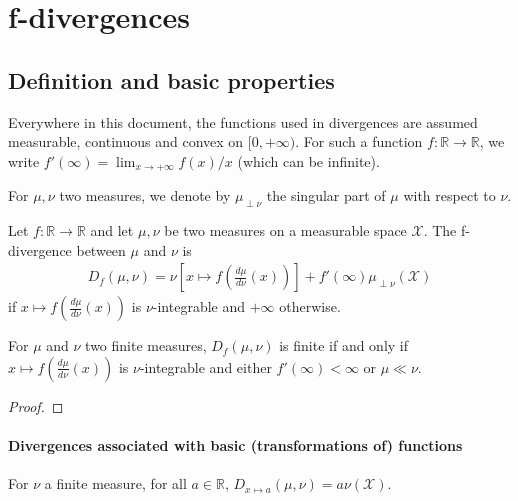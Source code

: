 \section{f-divergences}

\subsection{Definition and basic properties}

Everywhere in this document, the functions used in divergences are assumed measurable, continuous and convex on $[0, +\infty)$.
For such a function $f : \mathbb{R} \to \mathbb{R}$, we write $f'(\infty) = \lim_{x \to +\infty} f(x)/x$ (which can be infinite).

For $\mu, \nu$ two measures, we denote by $\mu_{\perp \nu}$ the singular part of $\mu$ with respect to $\nu$.

\begin{definition}[f-divergence]
  \label{def:fDiv}
  \leanok
  Let $f : \mathbb{R} \to \mathbb{R}$ and let $\mu, \nu$ be two measures on a measurable space $\mathcal X$. The f-divergence between $\mu$ and $\nu$ is
  \begin{align*}
  D_f(\mu, \nu) = \nu\left[x \mapsto f\left(\frac{d \mu}{d \nu}(x)\right)\right] + f'(\infty) \mu_{\perp \nu}(\mathcal X)
  \end{align*}
  if $x \mapsto f\left(\frac{d \mu}{d \nu}(x)\right)$ is $\nu$-integrable and $+\infty$ otherwise.
\end{definition}


\begin{lemma}
  \label{lem:fDiv_ne_top_iff}
  \leanok
  For $\mu$ and $\nu$ two finite measures, $D_f(\mu, \nu)$ is finite if and only if $x \mapsto f\left(\frac{d \mu}{d \nu}(x)\right)$ is $\nu$-integrable and either $f'(\infty) < \infty$ or $\mu \ll \nu$.
\end{lemma}

\begin{proof}\leanok
\end{proof}



\paragraph{Divergences associated with basic (transformations of) functions}

\begin{lemma}
  \label{lem:fDiv_const}
  \leanok
  For $\nu$ a finite measure, for all $a \in \mathbb{R}$, $D_{x \mapsto a}(\mu, \nu) = a \nu(\mathcal X)$.
\end{lemma}

